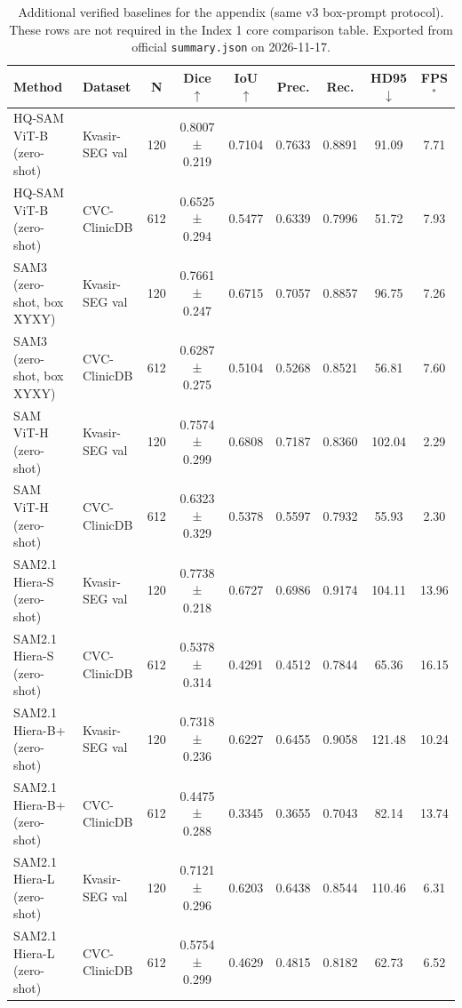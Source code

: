 \begin{table}[ht]
\centering
\caption{Additional verified baselines for the appendix (same v3 box-prompt protocol). These rows are not required in the Index 1 core comparison table. Exported from official \texttt{summary.json} on 2026-11-17.}
\label{tab:appendix-extra}
\begin{tabular}{llccccccc}
\toprule
Method & Dataset & N & Dice $\uparrow$ & IoU $\uparrow$ & Prec. & Rec. & HD95 $\downarrow$ & FPS$^*$ \\
\midrule
HQ-SAM ViT-B (zero-shot) & Kvasir-SEG val & 120 & 0.8007 ± 0.219 & 0.7104 & 0.7633 & 0.8891 & 91.09 & 7.71 \\
HQ-SAM ViT-B (zero-shot) & CVC-ClinicDB & 612 & 0.6525 ± 0.294 & 0.5477 & 0.6339 & 0.7996 & 51.72 & 7.93 \\
SAM3 (zero-shot, box XYXY) & Kvasir-SEG val & 120 & 0.7661 ± 0.247 & 0.6715 & 0.7057 & 0.8857 & 96.75 & 7.26 \\
SAM3 (zero-shot, box XYXY) & CVC-ClinicDB & 612 & 0.6287 ± 0.275 & 0.5104 & 0.5268 & 0.8521 & 56.81 & 7.60 \\
SAM ViT-H (zero-shot) & Kvasir-SEG val & 120 & 0.7574 ± 0.299 & 0.6808 & 0.7187 & 0.8360 & 102.04 & 2.29 \\
SAM ViT-H (zero-shot) & CVC-ClinicDB & 612 & 0.6323 ± 0.329 & 0.5378 & 0.5597 & 0.7932 & 55.93 & 2.30 \\
SAM2.1 Hiera-S (zero-shot) & Kvasir-SEG val & 120 & 0.7738 ± 0.218 & 0.6727 & 0.6986 & 0.9174 & 104.11 & 13.96 \\
SAM2.1 Hiera-S (zero-shot) & CVC-ClinicDB & 612 & 0.5378 ± 0.314 & 0.4291 & 0.4512 & 0.7844 & 65.36 & 16.15 \\
SAM2.1 Hiera-B+ (zero-shot) & Kvasir-SEG val & 120 & 0.7318 ± 0.236 & 0.6227 & 0.6455 & 0.9058 & 121.48 & 10.24 \\
SAM2.1 Hiera-B+ (zero-shot) & CVC-ClinicDB & 612 & 0.4475 ± 0.288 & 0.3345 & 0.3655 & 0.7043 & 82.14 & 13.74 \\
SAM2.1 Hiera-L (zero-shot) & Kvasir-SEG val & 120 & 0.7121 ± 0.296 & 0.6203 & 0.6438 & 0.8544 & 110.46 & 6.31 \\
SAM2.1 Hiera-L (zero-shot) & CVC-ClinicDB & 612 & 0.5754 ± 0.299 & 0.4629 & 0.4815 & 0.8182 & 62.73 & 6.52 \\

\end{tabular}
\end{table}
